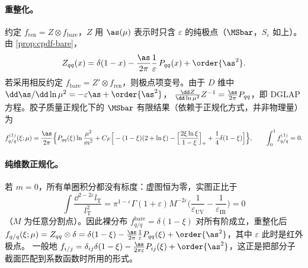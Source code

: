 \paragraph{重整化。}
约定 $f_{\mathrm{ren}}=Z\otimes f_{\mathrm{bare}}$，$Z$ 用 $\as(\mu)$ 表示时只含 $\varepsilon$ 的纯极点（$\MSbar$，$S_\varepsilon$ 如上）。由 \cref{prop:cpdf-bare}，
\begin{equation}\label{eq:cpdf-Z}
Z_{qq}(x)=\delta(1-x)-\frac{\as}{2\pi}\frac1\varepsilon\,P_{qq}(x)+\order{\as^2}.
\end{equation}
若采用相反约定 $f_{\mathrm{bare}}=Z'\otimes f_{\mathrm{ren}}$，则极点项变号。由于 $D$ 维中 $\dd\as/\dd\ln\mu^2=-\varepsilon\as+\order{\as^2}$，
$\frac{\dd Z}{\dd\ln\mu^2}Z^{-1}=\frac{\as}{2\pi}P_{qq}$，即 DGLAP 方程。胶子质量正规化下的 $\MSbar$ 有限结果（依赖于正规化方式，并非物理量）为
\begin{equation}
f^{(1)}_{q/q}(\xi;\mu)=\frac{\as}{2\pi}\Big\{P_{qq}(\xi)\ln\frac{\mu^2}{m^2}
+C_F\Big[-(1-\xi)(2+\ln\xi)-\Big[\frac{2\xi\ln\xi}{1-\xi}\Big]_++\frac14\delta(1-\xi)\Big]\Big\},
\qquad\int_0^1f^{(1)}_{q/q}=0 .
\end{equation}

\paragraph{纯维数正规化。}
若 $m=0$，所有单圈积分都没有标度：虚图恒为零，实图正比于
\begin{equation}
\int\frac{\dd^{2-2\varepsilon}l_{\mathrm T}}{l_{\mathrm T}^2}
=\pi^{1-\varepsilon}\Gamma(1+\varepsilon)M^{-2\varepsilon}\Big(\frac1{\varepsilon_{\mathrm{UV}}}-\frac1{\varepsilon_{\mathrm{IR}}}\Big)=0
\end{equation}
（$M$ 为任意分割点）。因此裸分布 $f^{\mathrm{bare}}_{q/q}=\delta(1-\xi)$ 对所有阶成立，重整化后
$f_{q/q}(\xi;\mu)=Z_{qq}\otimes\delta=\delta(1-\xi)-\frac{\as}{2\pi}\frac1\varepsilon P_{qq}(\xi)+\order{\as^2}$，其中 $\varepsilon$ 此时是红外极点。
一般地 $f_{i/j}=\delta_{ij}\delta(1-\xi)-\frac{\as}{2\pi\varepsilon}P_{ij}(\xi)+\order{\as^2}$，这正是把部分子截面匹配到系数函数时所用的形式。

